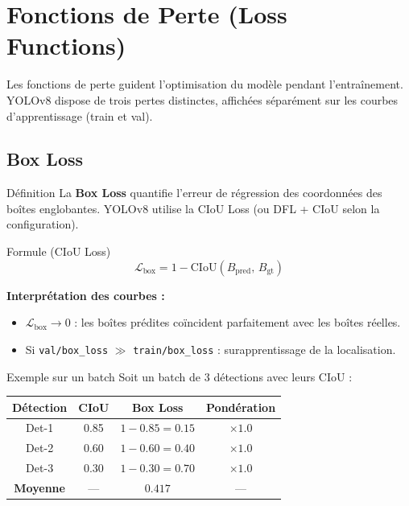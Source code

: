 \documentclass[12pt, a4paper]{report}
\begin{document}
\chapter{Fonctions de Perte (Loss Functions)}

Les fonctions de perte guident l'optimisation du modèle pendant l'entraînement.
YOLOv8 dispose de trois pertes distinctes, affichées séparément sur les courbes
d'apprentissage (train et val).

\section{Box Loss}

\begin{definitionbox}{Définition}
  La \textbf{Box Loss} quantifie l'erreur de régression des coordonnées des
  boîtes englobantes. YOLOv8 utilise la CIoU Loss (ou DFL + CIoU selon la
  configuration).
\end{definitionbox}

\begin{formulebox}{Formule (CIoU Loss)}
  \[
    \mathcal{L}_{\text{box}} = 1 - \text{CIoU}(B_{\text{pred}},\, B_{\text{gt}})
  \]
\end{formulebox}

\textbf{Interprétation des courbes :}
\begin{itemize}
  \item $\mathcal{L}_{\text{box}} \to 0$ : les boîtes prédites coïncident
        parfaitement avec les boîtes réelles.
  \item Si \texttt{val/box\_loss} $\gg$ \texttt{train/box\_loss} : surapprentissage
        de la localisation.
\end{itemize}

\begin{examplebox}{Exemple sur un batch}
  Soit un batch de 3 détections avec leurs CIoU :
  \begin{center}
  \begin{tabular}{cccc}
    \toprule
    \textbf{Détection} & \textbf{CIoU} & \textbf{Box Loss} & \textbf{Pondération} \\
    \midrule
    Det-1 & 0.85 & $1-0.85=0.15$ & $\times 1.0$ \\
    Det-2 & 0.60 & $1-0.60=0.40$ & $\times 1.0$ \\
    Det-3 & 0.30 & $1-0.30=0.70$ & $\times 1.0$ \\
    \midrule
    \textbf{Moyenne} & — & $\mathbf{0.417}$ & — \\
    \bottomrule
  \end{tabular}
  \end{center}
\end{examplebox}
\end{document}
